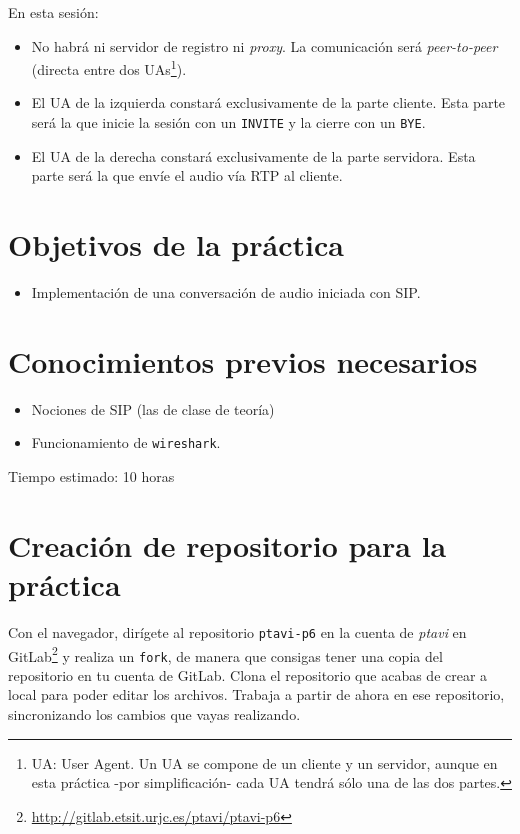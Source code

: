 \documentclass[a4paper,11pt]{article}
\begin{document}
En esta sesión:

\begin{itemize}
  \item No habrá ni servidor de registro ni \emph{proxy}. La comunicación será \emph{peer-to-peer} (directa entre dos UAs\footnote{UA: User Agent. Un UA se compone de un cliente y un servidor, aunque en esta práctica -por simplificación- cada UA tendrá sólo una de las dos partes.}).
  \item El UA de la izquierda constará exclusivamente de la parte cliente. Esta parte será la que inicie la sesión con un \texttt{INVITE} y la cierre con un \texttt{BYE}.
  \item El UA de la derecha constará exclusivamente de la parte servidora. Esta parte será la que envíe el audio vía RTP al cliente.
\end{itemize}


\section*{Objetivos de la práctica}

\begin{itemize}
  \item Implementación de una conversación de audio iniciada con SIP.
\end{itemize}

\section*{Conocimientos previos necesarios}

\begin{itemize}
  \item Nociones de SIP (las de clase de teoría)
  \item Funcionamiento de \texttt{wireshark}.
\end{itemize}

Tiempo estimado: 10 horas

\section*{Creación de repositorio para la práctica}

Con el navegador, dirígete al repositorio \texttt{ptavi-p6} en la cuenta de \emph{ptavi} en GitLab\footnote{\url{http://gitlab.etsit.urjc.es/ptavi/ptavi-p6}} y realiza un \texttt{fork}, de manera que consigas tener una copia del repositorio en tu cuenta de GitLab. Clona el repositorio que acabas de crear a local para poder editar los archivos. Trabaja a partir de ahora en ese repositorio, sincronizando los cambios que vayas realizando.
\end{document}
